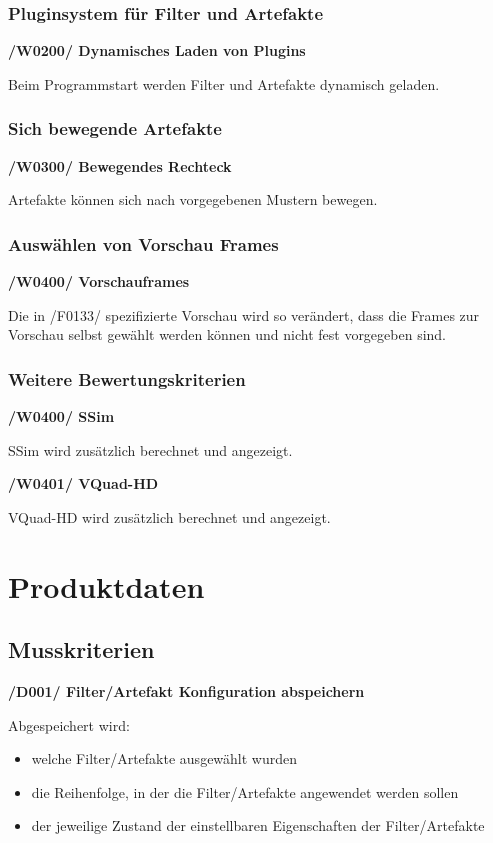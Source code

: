 \documentclass[parskip=full]{scrartcl}
\begin{document}
\subsubsection{Pluginsystem für Filter und Artefakte}

\textbf{/W0200/ Dynamisches Laden von Plugins}

Beim Programmstart werden Filter und Artefakte dynamisch geladen.

\subsubsection{Sich bewegende Artefakte}

\textbf{/W0300/ Bewegendes Rechteck}

Artefakte können sich nach vorgegebenen Mustern bewegen.

\subsubsection{Auswählen von Vorschau Frames}

\textbf{/W0400/ Vorschauframes}

Die in /F0133/ spezifizierte Vorschau wird so verändert, dass die Frames zur Vorschau selbst gewählt werden können und nicht fest vorgegeben sind.

\subsubsection{Weitere Bewertungskriterien}

\textbf{/W0400/ SSim}

SSim wird zusätzlich berechnet und angezeigt.

\textbf{/W0401/ VQuad-HD}

VQuad-HD wird zusätzlich berechnet und angezeigt.


\newpage
\section{Produktdaten}
\subsection{Musskriterien}
\textbf{/D001/ Filter/Artefakt Konfiguration abspeichern}

Abgespeichert wird:
\begin{itemize}
\item welche Filter/Artefakte ausgewählt wurden
\item die Reihenfolge, in der die Filter/Artefakte angewendet werden sollen
\item der jeweilige Zustand der einstellbaren Eigenschaften der Filter/Artefakte
\end{itemize}
\end{document}
